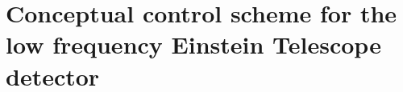 \chapter{\label{c:et-lf-control}Conceptual control scheme for the low frequency Einstein Telescope detector}

\newcommand{\AS}{AS}
\newcommand{\POP}{POP}
\newcommand{\REFL}{REFL}

\newcommand{\ASDC}{$\text{\AS}_{\text{DC}}$}
\newcommand{\ASFIRSTI}{$\text{\AS}_{\num{11}}^{\text{I}}$}
\newcommand{\ASFIRSTQ}{$\text{\AS}_{\num{11}}^{\text{Q}}$}
\newcommand{\ASSECONDI}{$\text{\AS}_{\num{57}}^{\text{I}}$}
\newcommand{\ASSECONDQ}{$\text{\AS}_{\num{57}}^{\text{Q}}$}
\newcommand{\ASSUMI}{$\text{\AS}_{\num{68}}^{\text{I}}$}
\newcommand{\ASSUMQ}{$\text{\AS}_{\num{68}}^{\text{Q}}$}
\newcommand{\ASDIFFI}{$\text{\AS}_{\num{45}}^{\text{I}}$}
\newcommand{\ASDIFFQ}{$\text{\AS}_{\num{45}}^{\text{Q}}$}
\newcommand{\POPDC}{$\text{\POP}_{\text{DC}}$}
\newcommand{\POPFIRSTI}{$\text{\POP}_{\num{11}}^{\text{I}}$}
\newcommand{\POPFIRSTQ}{$\text{\POP}_{\num{11}}^{\text{Q}}$}
\newcommand{\POPSECONDI}{$\text{\POP}_{\num{57}}^{\text{I}}$}
\newcommand{\POPSECONDQ}{$\text{\POP}_{\num{57}}^{\text{Q}}$}
\newcommand{\POPSUMI}{$\text{\POP}_{\num{68}}^{\text{I}}$}
\newcommand{\POPSUMQ}{$\text{\POP}_{\num{68}}^{\text{Q}}$}
\newcommand{\POPDIFFI}{$\text{\POP}_{\num{45}}^{\text{I}}$}
\newcommand{\POPDIFFQ}{$\text{\POP}_{\num{45}}^{\text{Q}}$}
\newcommand{\REFLDC}{$\text{\REFL}_{\text{DC}}$}
\newcommand{\REFLFIRSTI}{$\text{\REFL}_{\num{11}}^{\text{I}}$}
\newcommand{\REFLFIRSTQ}{$\text{\REFL}_{\num{11}}^{\text{Q}}$}
\newcommand{\REFLSECONDI}{$\text{\REFL}_{\num{57}}^{\text{I}}$}
\newcommand{\REFLSECONDQ}{$\text{\REFL}_{\num{57}}^{\text{Q}}$}
\newcommand{\REFLSUMI}{$\text{\REFL}_{\num{68}}^{\text{I}}$}
\newcommand{\REFLSUMQ}{$\text{\REFL}_{\num{68}}^{\text{Q}}$}
\newcommand{\REFLDIFFI}{$\text{\REFL}_{\num{45}}^{\text{I}}$}
\newcommand{\REFLDIFFQ}{$\text{\REFL}_{\num{45}}^{\text{Q}}$}

\newcommand{\ASFIRST}{$\text{\AS}_{\num{11}}$}
\newcommand{\ASSECOND}{$\text{\AS}_{\num{57}}$}
\newcommand{\ASSUM}{$\text{\AS}_{\num{68}}$}
\newcommand{\ASDIFF}{$\text{\AS}_{\num{45}}$}
\newcommand{\POPFIRST}{$\text{\POP}_{\num{11}}$}
\newcommand{\POPSECOND}{$\text{\POP}_{\num{57}}$}
\newcommand{\POPSUM}{$\text{\POP}_{\num{68}}$}
\newcommand{\POPDIFF}{$\text{\POP}_{\num{45}}$}
\newcommand{\REFLFIRST}{$\text{\REFL}_{\num{11}}$}
\newcommand{\REFLSECOND}{$\text{\REFL}_{\num{57}}$}
\newcommand{\REFLSUM}{$\text{\REFL}_{\num{68}}$}
\newcommand{\REFLDIFF}{$\text{\REFL}_{\num{45}}$}

